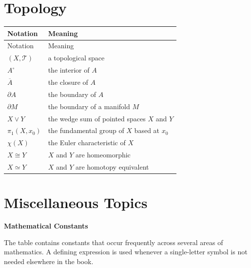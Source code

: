     \section*{Topology}

    {\small
    \renewcommand{\arraystretch}{1.18}
    \begin{longtable}{@{}L{0.27\textwidth}L{0.65\textwidth}@{}}
        \toprule
        Notation & Meaning \\
        \midrule
        \endfirsthead

        \toprule
        Notation & Meaning \\
        \midrule
        \endhead

        \bottomrule
        \endlastfoot

        $(X,\mathcal{T})$ & a topological space \\
        $A^\circ$ & the interior of $A$ \\
        $\overline{A}$ & the closure of $A$ \\
        $\partial A$ & the boundary of $A$ \\
        $\partial M$ & the boundary of a manifold $M$ \\
        $X\vee Y$ & the wedge sum of pointed spaces $X$ and $Y$ \\
        $\pi_1(X,x_0)$ & the fundamental group of $X$ based at $x_0$ \\
        $\chi(X)$ & the Euler characteristic of $X$ \\
        $X\cong Y$ & $X$ and $Y$ are homeomorphic \\
        $X\simeq Y$ & $X$ and $Y$ are homotopy equivalent \\
    \end{longtable}
    }

    \section*{Miscellaneous Topics}

    \noindent\textbf{Mathematical Constants}

    \vspace{0.5em}

    The table contains constants that occur frequently across several areas of
    mathematics. A defining expression is used whenever a single-letter symbol
    is not needed elsewhere in the book.

    \vspace{0.5em}

